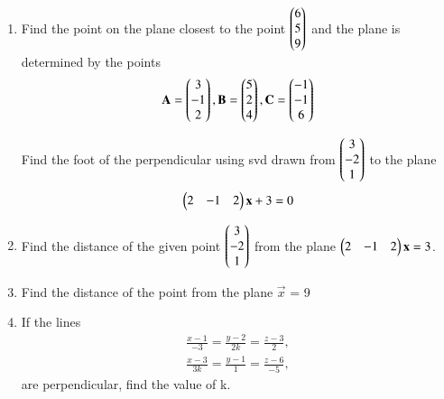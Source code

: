 \begin{enumerate}[label=\thesubsection.\arabic*.,ref=\thesubsection.\theenumi]
\solution

\item Find the point on the plane closest to the point $\begin{pmatrix}6\\5\\9\end{pmatrix}$ and the plane is determined by the points 
\begin{align*}
    \mathbf{A}=\begin{pmatrix}3\\-1\\2\end{pmatrix}, \mathbf{B}=\begin{pmatrix}5\\2\\4\end{pmatrix}, \mathbf{C}=\begin{pmatrix}-1\\-1\\6\end{pmatrix}
\end{align*}
\solution

%
 Find the foot of the perpendicular using svd drawn from $\begin{pmatrix}3\\-2\\1\end{pmatrix}$ to the plane
 \begin{align}
 \begin{pmatrix}2&-1&2\end{pmatrix}\mathbf{x}+3=0
 \end{align}
%
\solution
%
%
\item 
Find the distance of the given point $\begin{pmatrix}3\\-2\\1\end{pmatrix}$ from the plane $\begin{pmatrix}2&-1&2\end{pmatrix}\mathbf{x} = 3$.

\solution

%
\item Find the distance of the point  from the plane $\vec{x}$ = 9

\solution


\item If the lines
\begin{align}
	\frac{x - 1}{-3} = \frac{y - 2}{2k} = \frac{z - 3}{2},\\
	\frac{x - 3}{3k} = \frac{y - 1}{1} = \frac{z - 6}{-5},
\end{align}
are perpendicular, find the value of k.

\solution


\end{enumerate}
